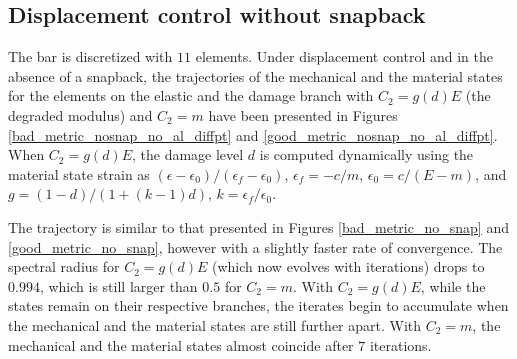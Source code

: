 \documentclass[10pt]{cas-sc}
\begin{document}
\begin{deletedblock}
\subsection*{Displacement control without snapback}
The bar is discretized with $11$ elements. Under displacement control and in the absence of a snapback, the trajectories of the mechanical and the material states for the elements on the elastic and the damage branch with $C_2 = g(d) E$ (the degraded modulus) and $C_2 = m$ have been presented in Figures \ref{bad_metric_nosnap_no_al_diffpt} and \ref{good_metric_nosnap_no_al_diffpt}. When $C_2 = g(d) E$, the damage level $d$ is computed dynamically using the material state strain as $(\epsilon - \epsilon_0)/(\epsilon_f - \epsilon_0)$, $\epsilon_f=-c/m$, $\epsilon_0=c/(E-m)$, and $g=(1-d)/(1+(k-1)d)$, $k=\epsilon_f/\epsilon_0$.



The trajectory is similar to that presented in Figures \ref{bad_metric_no_snap} and \ref{good_metric_no_snap}, however with a slightly faster rate of convergence. The spectral radius for $C_2 = g(d) E$ (which now evolves with iterations) drops to $0.994$, which is still larger than $0.5$ for $C_2=m$. With $C_2 = g(d) E$, while the states remain on their respective branches, the iterates begin to accumulate when the mechanical and the material states are still further apart. With $C_2 = m$, the mechanical and the material states almost coincide after $7$ iterations.
\end{deletedblock}
\end{document}
